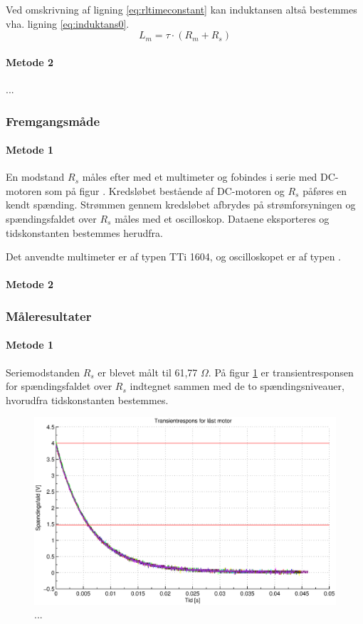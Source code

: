 Ved omskrivning af ligning \ref{eq:rltimeconstant} kan induktansen altså bestemmes vha. ligning \ref{eq:induktans0}.
\begin{equation}
	L_m=\tau\cdot(R_m+R_s)
	\label{eq:induktans0} 
 \end{equation}
\paragraph{Metode 2}
...
\subsubsection{Fremgangsmåde}
\paragraph{Metode 1}
En modstand $R_s$ måles efter med et multimeter og fobindes i serie med DC-motoren
som på figur %
.
Kredsløbet bestående af DC-motoren og $R_s$ påføres en kendt spænding.
Strømmen gennem kredsløbet afbrydes på strømforsyningen og spændingsfaldet
over $R_s$ måles med et oscilloskop.
Dataene eksporteres og tidskonstanten bestemmes herudfra.

Det anvendte multimeter er af typen TTi 1604,
og oscilloskopet er af typen .

\paragraph{Metode 2}
\subsubsection{Måleresultater}
\paragraph{Metode 1}
Seriemodstanden $R_s$ er blevet målt til 61,77 $\Omega$.
På figur \ref{fig:induktans0} er transientresponsen for spændingsfaldet over $R_s$ indtegnet
sammen med de to spændingsniveauer, hvorudfra tidskonstanten bestemmes.
\begin{figure}[th!]
	\centering
	\includegraphics[width=1\textwidth]{./graphics/induktans0.eps}
	\caption[...]{...}
	\label{fig:induktans0}
\end{figure}

